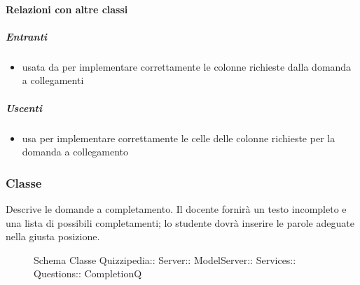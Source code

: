 \paragraph{Relazioni con altre classi}
\subparagraph{Entranti}
\begin{itemize}
\item usata da  per implementare correttamente le colonne richieste dalla domanda a collegamenti
\end{itemize}
\subparagraph{Uscenti}
\begin{itemize}
\item usa  per implementare correttamente le celle delle colonne richieste per la domanda a collegamento
\end{itemize}
\subsubsection{Classe }
Descrive le domande a completamento. Il docente fornirà un testo incompleto e una lista di possibili completamenti; lo studente dovrà inserire le parole adeguate nella giusta posizione.
\begin{figure}[H]
\centering
\noindent{}
\caption[Schema Classe CompletionQ]{Schema Classe Quizzipedia:: Server:: ModelServer:: Services:: Questions:: CompletionQ}
\end{figure}
